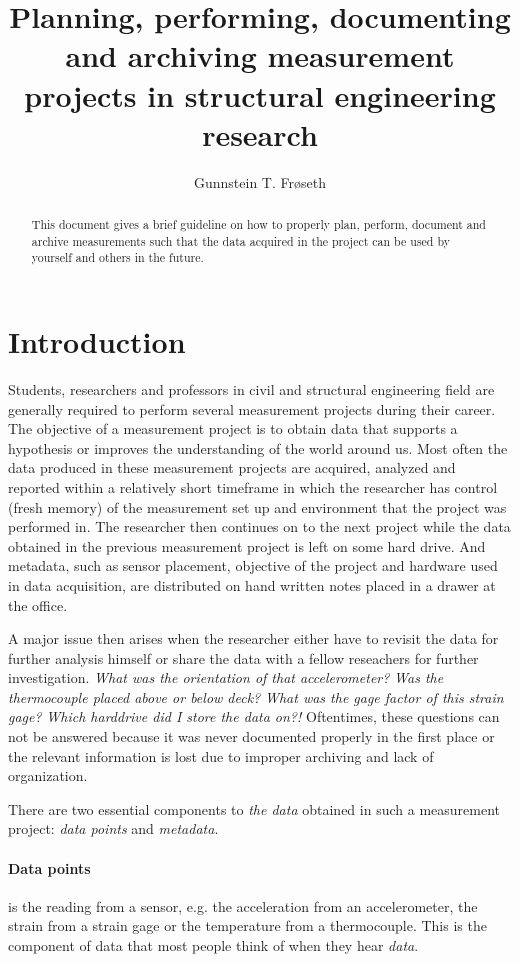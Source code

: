 \documentclass{article}
\title{Planning, performing, documenting and archiving measurement projects in structural engineering research}
\author{Gunnstein T. Frøseth}
\date{}
\begin{document}
\thispagestyle{empty}
\maketitle

\begin{abstract}
  This document gives a brief guideline on how to properly plan, perform, document and archive measurements such that the data acquired in the project can be used by yourself and others in the future.
\end{abstract}


\section{Introduction}
Students, researchers and professors in civil and structural engineering field are generally required to perform several measurement projects during their career.  The objective of a measurement project is to obtain data that supports a hypothesis or improves the understanding of the world around us.  Most often the data produced in these measurement projects are acquired, analyzed and reported within a relatively short timeframe in which the researcher has control (fresh memory) of the measurement set up and environment that the project was performed in.  The researcher then continues on to the next project while the data obtained in the previous measurement project is left on some hard drive.  And metadata, such as sensor placement, objective of the project and hardware used in data acquisition, are distributed on hand written notes placed in a drawer at the office.

A major issue then arises when the researcher either have to revisit the data for further analysis himself or share the data with a fellow reseachers for further investigation.  \emph{What was the orientation of that accelerometer?}  \emph{Was the thermocouple placed above or below deck?}  \emph{What was the gage factor of this strain gage?}  \emph{Which harddrive did I store the data on?!}  Oftentimes, these questions can not be answered because it was never documented properly in the first place or the relevant information is lost due to improper archiving and lack of organization.


There are two essential components to \emph{the data} obtained in such a measurement project: \emph{data points} and \emph{metadata}.

\paragraph{Data points} is the reading from a sensor, e.g. the acceleration from an accelerometer, the strain from a strain gage or the temperature from a thermocouple.  This is the component of data that most people think of when they hear \emph{data}.
\end{document}
